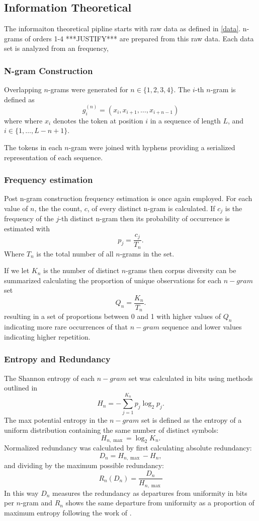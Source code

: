 \documentclass[preprint,12pt]{elsarticle}
\begin{document}
\subsection{Information Theoretical}
The informaiton theoretical pipline starts with raw data as defined in \ref{data}. n-grams of orders 1-4 ***JUSTIFY*** are prepared from this raw data. Each data set is analyzed from an frequency, 

\subsubsection{N-gram Construction}
Overlapping \(n\)-grams were generated for \(n \in \{1,2,3,4\}\). The \(i\)-th \(n\)-gram is defined as
\[
g_i^{(n)} = (x_i,x_{i+1},\ldots,x_{i+n-1})
\]
where where \(x_i\) denotes the token at position \(i\) in a sequence of length \(L\), and \(i \in \{1,\ldots,L-n+1\}\).

The tokens in each \(n\)-gram were joined with hyphens providing a serialized representation of each sequence. 

\subsubsection{Frequency estimation}
Post n-gram construction frequency estimation is once again employed. For each value of \(n\), the the count, \(c\), of every distinct n-gram is calculated. If \(c_j\) is the frequency of the \(j\)-th distinct n-gram then its probability of occurrence is estimated with 
\[
p_j = \frac{c_j}{T_n}.
\]
Where \(T_n\) is the total number of all \(n\)-grams in the set.

If we let \(K_n\) is the number of distinct \(n\)-grams then corpus diversity can be summarized calculating the proportion of unique observations for each \(n-gram\) set
\[
Q_n = \frac{K_n}{T_n}.
\]
resulting in a set of proportions between 0 and 1 with higher values of \(Q_n\) indicating more rare occurrences of that \(n-gram\) sequence and lower values indicating higher repetition. 

\subsubsection{Entropy and Redundancy}
The Shannon entropy of each \(n-gram\) set was calculated in bits using methods outlined in \cite{}
\[
H_n = -\sum_{j=1}^{K_n} p_j \log_2 p_j.
\]
The max potential entropy in the \(n-gram\) set is defined as the entropy of a uniform distribution containing the same number of distinct symbols: 
\[
H_{n,\max} = \log_2 K_n.
\]
Normalized redundancy was calculated by first calculating absolute redundancy:
\[
D_n = H_{n,\max}-H_n,
\] and dividing by the maximum possible redundancy:
\[
R_n(D_n)=\frac{D_n}{H_{n,\max}}
\]
In this way \(D_n\) measures the redundancy as departures from uniformity in bits per \(n\)-gram and \(R_n\) shows the same departure from uniformity as a proportion of maximum entropy following the work of \cite{}. 
\end{document}
